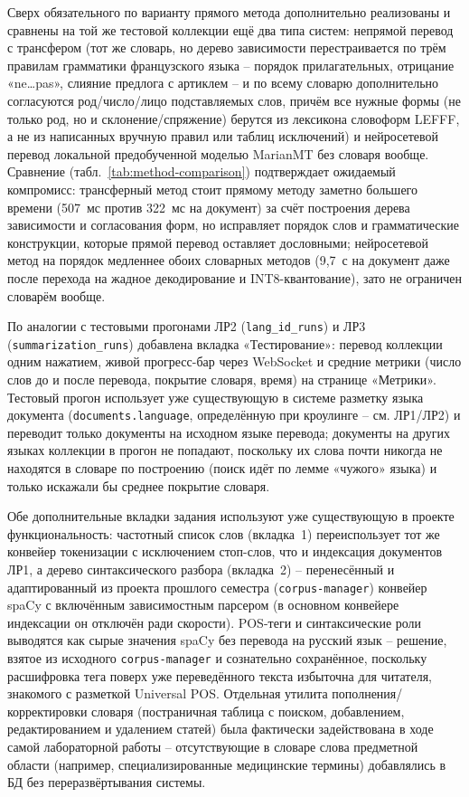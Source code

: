 Сверх обязательного по варианту прямого метода дополнительно
реализованы и сравнены на той же тестовой коллекции ещё два типа
систем: непрямой перевод с трансфером (тот же словарь, но дерево
зависимости перестраивается по трём правилам грамматики французского
языка -- порядок прилагательных, отрицание «ne\ldots pas», слияние
предлога с артиклем -- и по всему словарю дополнительно согласуются
род/число/лицо подставляемых слов, причём все нужные формы (не только
род, но и склонение/спряжение) берутся из лексикона словоформ LEFFF,
а не из написанных вручную правил или таблиц исключений) и нейросетевой
перевод локальной предобученной
моделью MarianMT без словаря вообще. Сравнение (табл.~\ref{tab:method-comparison})
подтверждает ожидаемый компромисс: трансферный метод стоит прямому
методу заметно большего времени (507~мс против 322~мс на
документ) за счёт построения дерева зависимости и согласования форм, но
исправляет порядок слов и грамматические конструкции, которые прямой
перевод оставляет дословными; нейросетевой метод на порядок медленнее обоих словарных
методов (9{,}7~с на документ даже после перехода на жадное
декодирование и INT8-квантование), зато не ограничен словарём вообще.

По аналогии с тестовыми прогонами ЛР2 (\texttt{lang\_id\_runs}) и ЛР3
(\texttt{summarization\_runs}) добавлена вкладка «Тестирование»:
перевод коллекции одним нажатием, живой прогресс-бар через WebSocket
и средние метрики (число слов до и после перевода, покрытие словаря,
время) на странице «Метрики». Тестовый прогон использует уже
существующую в системе разметку языка документа
(\texttt{documents.language}, определённую при кроулинге -- см.
ЛР1/ЛР2) и переводит только документы на исходном языке перевода;
документы на других языках коллекции в прогон не попадают, поскольку
их слова почти никогда не находятся в словаре по построению (поиск
идёт по лемме «чужого» языка) и только искажали бы среднее покрытие
словаря.

Обе дополнительные вкладки задания используют уже существующую в
проекте функциональность: частотный список слов (вкладка~1)
переиспользует тот же конвейер токенизации с исключением стоп-слов,
что и индексация документов ЛР1, а дерево синтаксического разбора
(вкладка~2) -- перенесённый и адаптированный из проекта прошлого
семестра (\texttt{corpus-manager}) конвейер spaCy с включённым
зависимостным парсером (в основном конвейере индексации он отключён
ради скорости). POS-теги и синтаксические роли выводятся как сырые
значения spaCy без перевода на русский язык -- решение, взятое из
исходного \texttt{corpus-manager} и сознательно сохранённое, поскольку
расшифровка тега поверх уже переведённого текста избыточна для
читателя, знакомого с разметкой Universal POS. Отдельная утилита
пополнения/корректировки словаря (постраничная таблица с поиском,
добавлением, редактированием и удалением статей) была фактически
задействована в ходе самой лабораторной работы -- отсутствующие в
словаре слова предметной области (например, специализированные
медицинские термины) добавлялись в БД без переразвёртывания системы.
